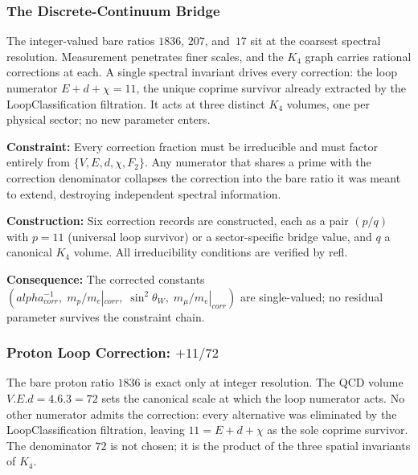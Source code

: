 \documentclass[11pt,a4paper]{book}
\def\alpha{alpha}%
\def\cdot{.}%
\def\mathrm#1{#1}%
\def\texttt#1{#1}%
\begin{document}
\subsubsection*{The Discrete-Continuum Bridge}

The integer-valued bare ratios $1836$, $207$, and~$17$ sit at the coarsest
spectral resolution.  Measurement penetrates finer scales, and the $K_4$ graph
carries rational corrections at each.  A single spectral invariant drives every
correction: the loop numerator $E + d + \chi = 11$, the unique coprime survivor
already extracted by the \texttt{LoopClassification} filtration.  It acts at three
distinct $K_4$ volumes, one per physical sector; no new parameter enters.

\medskip
\noindent
\textbf{Constraint:}
Every correction fraction must be irreducible and must factor entirely from
$\{V, E, d, \chi, F_2\}$.  Any numerator that shares a prime with the correction
denominator collapses the correction into the bare ratio it was meant to extend,
destroying independent spectral information.

\noindent
\textbf{Construction:}
Six correction records are constructed, each as a pair $(p/q)$ with $p = 11$
(universal loop survivor) or a sector-specific bridge value, and $q$ a canonical
$K_4$ volume.  All irreducibility conditions are verified by \texttt{refl}.

\noindent
\textbf{Consequence:}
The corrected constants $(\alpha^{-1}_{\mathrm{corr}},\; m_p/m_e|_{\mathrm{corr}},\;
\sin^2\!\theta_W,\; m_\mu/m_e|_{\mathrm{corr}})$ are single-valued; no residual
parameter survives the constraint chain.

\subsubsection*{Proton Loop Correction: $+11/72$}

The bare proton ratio $1836$ is exact only at integer resolution.  The QCD volume
$V \cdot E \cdot d = 4 \cdot 6 \cdot 3 = 72$ sets the canonical scale at which
the loop numerator acts.  No other numerator admits the correction: every
alternative was eliminated by the \texttt{LoopClassification} filtration, leaving
$11 = E + d + \chi$ as the sole coprime survivor.  The denominator $72$ is not
chosen; it is the product of the three spatial invariants of $K_4$.
\end{document}
